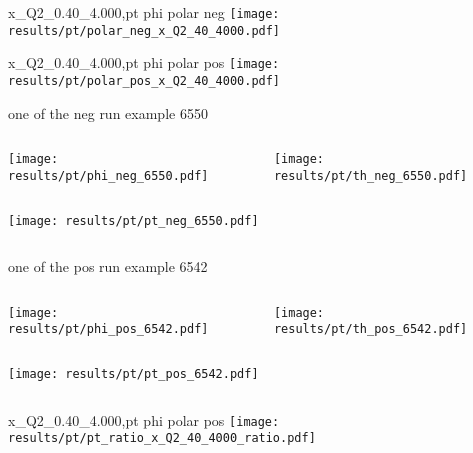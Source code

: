\begin{frame}{x\_Q2\_0.40\_4.000,pt phi polar neg}
\texttt{[image: results/pt/polar\_neg\_x\_Q2\_40\_4000.pdf]}
\end{frame}
\begin{frame}{x\_Q2\_0.40\_4.000,pt phi polar pos}
\texttt{[image: results/pt/polar\_pos\_x\_Q2\_40\_4000.pdf]}
\end{frame}
\begin{frame}{one of the neg run example 6550}
\begin{columns}
\begin{column}[T]{0.5\textwidth}
\texttt{[image: results/pt/phi\_neg\_6550.pdf]}
\end{column}
\begin{column}[T]{0.5\textwidth}
\texttt{[image: results/pt/th\_neg\_6550.pdf]}
\end{column}
\end{columns}
\begin{columns}
\begin{column}[T]{0.5\textwidth}
\texttt{[image: results/pt/pt\_neg\_6550.pdf]}
\end{column}
\begin{column}[T]{0.5\textwidth}
\end{column}
\end{columns}
\end{frame}
\begin{frame}{one of the pos run example 6542}
\begin{columns}
\begin{column}[T]{0.5\textwidth}
\texttt{[image: results/pt/phi\_pos\_6542.pdf]}
\end{column}
\begin{column}[T]{0.5\textwidth}
\texttt{[image: results/pt/th\_pos\_6542.pdf]}
\end{column}
\end{columns}
\begin{columns}
\begin{column}[T]{0.5\textwidth}
\texttt{[image: results/pt/pt\_pos\_6542.pdf]}
\end{column}
\begin{column}[T]{0.5\textwidth}
\end{column}
\end{columns}
\end{frame}
\begin{frame}{x\_Q2\_0.40\_4.000,pt phi polar pos}
\texttt{[image: results/pt/pt\_ratio\_x\_Q2\_40\_4000\_ratio.pdf]}
\end{frame}
